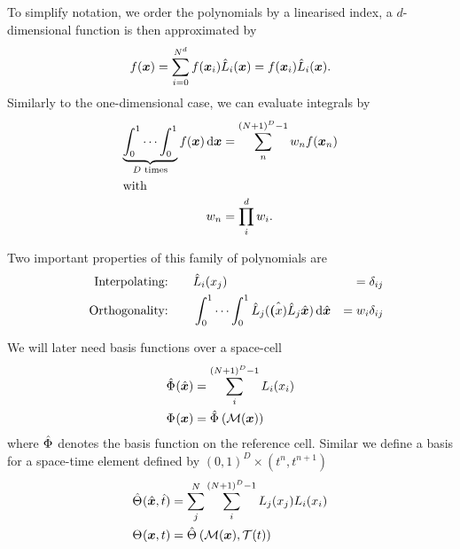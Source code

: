 To simplify notation, we order the polynomials by a linearised index, a $d$-dimensional function is then approximated by
\begin{equation}
  \label{eq:lagrange-expansion}
  f(\bm{x}) = \sum_{i = 0}^{N^d} f(\bm{x}_i) \lagrangeRef[i](\bm{x}) = f(\bm{x}_i) \lagrangeRef[i](\bm{x}).
\end{equation}
Similarly to the one-dimensional case, we can evaluate integrals by
\begin{align}
  \label{eq:quadrature}
  \underbrace{\int_0^1 \cdots \int_0^1}_{D \text{ times}} f(\bm{x}) \dd{\bm{x}} &= \sum_n^{(N+1)^D - 1} \quadWeight[n] f(\bm{x}_n) \\
  \intertext{with}
  \quadWeight[n] &= \prod_{i}^{d} \quadWeight[i].
\end{align}

Two important properties of this family of polynomials are
  \begin{alignat}{10}
    \label{eq:basis-interpolating}
&& \text{Interpolating:} \qquad & \lagrangeRef[i] (x_j) &= \delta_{ij}\\
\label{eq:basis-orthogonality}
&& \text{Orthogonality:} \qquad &
\int_0^1 \cdots \int_0^1 \lagrangeRef[j](\hat{\bm(x)} \lagrangeRef[j]{\hat{\bm{x}}}) \dd{\hat{\bm{x}}}  &= \quadWeight[i] \delta_{ij}
    \end{alignat}

We will later need basis functions over a space-cell 
\begin{align}\label{eq:space-basis}
  \begin{split}
  \sbasisRef(\hat{\bm{x}}) &= \sum_i^{(N+1)^D - 1} \lagrange[i] (x_i)\\
  \sbasis(\bm{x}) &= \sbasisRef \left( \mapping(\bm{x}) \right)
  \end{split}
\end{align}
where $\sbasisRef$ denotes the basis function on the reference cell.
Similar we define a basis for a space-time element defined by $(0, 1)^D \times (t^n, t^{n+1})$
\begin{align}\label{eq:space-time-basis}
  \begin{split}
  \stbasisRef(\hat{\bm{x}}, \hat{t}) &= \sum_j^{N} \sum_i^{(N+1)^D - 1} \lagrange[j](x_j) \lagrange[i] (x_i)\\
  \stbasis (\bm{x}, t) &= \stbasisRef \left( \mapping(\bm{x}), \timeMapping(t) \right)
  \end{split}
\end{align}

